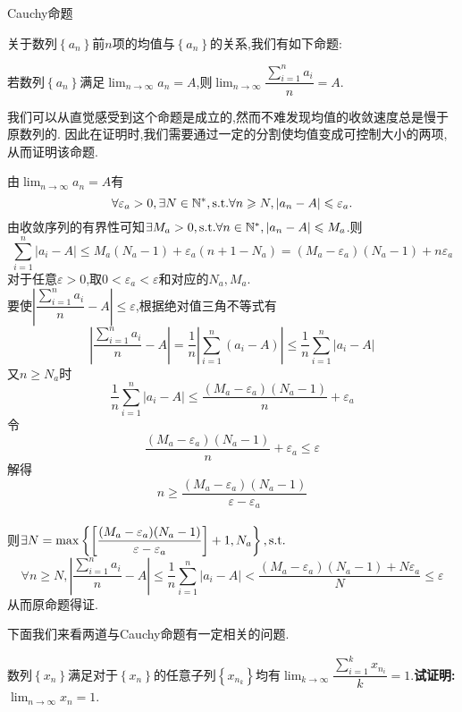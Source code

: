 \documentclass[a4paper]{ctexart}
\begin{document}
\pagestyle{empty}
\begin{center}
    \large Cauchy命题
\end{center}
关于数列$\left\{ a_n\right\}$前$n$项的均值与$\left\{ a_n\right\}$的关系,我们有如下命题:
\begin{formal}
    若数列$\left\{ a_n\right\}$满足$\displaystyle\lim_{n\to\infty}{a_n}=A$,则$\displaystyle\lim_{n\to\infty}{\dfrac{\sum_{i=1}^{n}{a_i}}{n}}=A$.
\end{formal}
\begin{analyze}[Analysis.]
    我们可以从直觉感受到这个命题是成立的,然而不难发现均值的收敛速度总是慢于原数列的.
    因此在证明时,我们需要通过一定的分割使均值变成可控制大小的两项,从而证明该命题.
\end{analyze}
\begin{solution}[Proof.]
    由$\displaystyle\lim_{n\to\infty}{a_n}=A$有
    $$\forall\varepsilon_a>0,\exists N\in\mathbb{N}^*,\text{s.t.}\forall n\geqslant N,\left\lvert a_n-A\right\rvert\leqslant\varepsilon_a.$$
    由收敛序列的有界性可知$\exists M_a>0,\text{s.t.}\forall n\in\mathbb{N}^*,\left|a_n-A\right|\leqslant M_a$.则
    $$\sum_{i=1}^{n}{\left\lvert a_i-A\right\rvert}\leqslant M_a(N_a-1)+\varepsilon_a(n+1-N_a)=(M_a-\varepsilon_a)(N_a-1)+n\varepsilon_a$$
    对于任意$\varepsilon>0$,取$0<\varepsilon_a<\varepsilon$和对应的$N_a,M_a$.\\
    要使$\left\lvert \dfrac{\sum_{i=1}^{n}{a_i}}{n}-A\right\rvert\leqslant\varepsilon$,根据绝对值三角不等式有
    $$\left\lvert \dfrac{\sum_{i=1}^{n}{a_i}}{n}-A\right\rvert=\dfrac{1}{n}\left\lvert \sum_{i=1}^{n}{(a_i-A)}\right\rvert\leqslant\dfrac{1}{n}\sum_{i=1}^{n}{\left\lvert a_i-A\right\rvert}$$
    又$n\geqslant N_a$时$$\dfrac{1}{n}\sum_{i=1}^{n}{\left\lvert a_i-A\right\rvert}\leqslant\dfrac{(M_a-\varepsilon_a)(N_a-1)}{n}+\varepsilon_a$$
    令$$\dfrac{(M_a-\varepsilon_a)(N_a-1)}{n}+\varepsilon_a\leqslant\varepsilon$$
    解得$$n\geqslant\dfrac{(M_a-\varepsilon_a)(N_a-1)}{\varepsilon-\varepsilon_a}$$\\
    则$\exists N=\max\left\{\left[\dfrac{(M_a-\varepsilon_a)(N_a-1)}{\varepsilon-\varepsilon_a}\right]+1,N_a\right\},\text{s.t.}$
    $$\forall n\geqslant N,\left\lvert \dfrac{\sum_{i=1}^{n}{a_i}}{n}-A\right\rvert
    \leqslant\dfrac{1}{n}\sum_{i=1}^{n}{\left\lvert a_i-A\right\rvert}<\dfrac{(M_a-\varepsilon_a)(N_a-1)+N\varepsilon_a}{N}\leqslant\varepsilon$$
    从而原命题得证.
\end{solution}\noindent
下面我们来看两道与Cauchy命题有一定相关的问题.
\begin{problem}[例1(24.10.09 SJTU数分小测):]
    数列$\left\{ x_n\right\}$满足对于$\left\{ x_n\right\}$的任意子列$\left\{ x_{n_k}\right\}$均有$\displaystyle\lim_{k\to\infty}{\dfrac{\sum_{i=1}^{k}{x_{n_i}}}{k}}=1$.\textbf{试证明:}$\displaystyle\lim_{n\to\infty}{x_n}=1$.
\end{problem}
\end{document}
